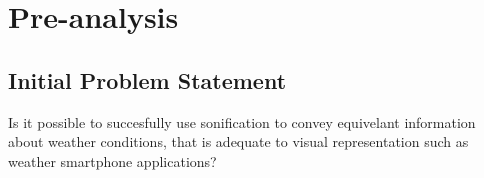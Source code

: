 \section{Pre-analysis} \label{sec:preanalysus}


\subsection{Initial Problem Statement}
Is it possible to succesfully use sonification to convey equivelant information about weather conditions,
that is adequate to visual representation such as weather smartphone applications?